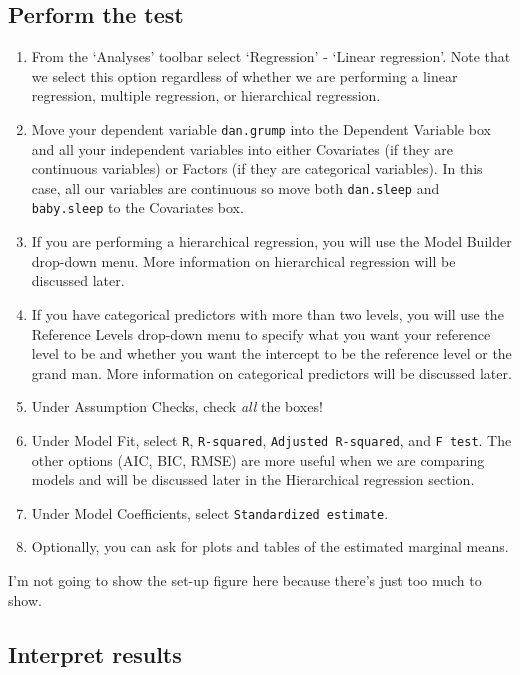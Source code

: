 \documentclass[
]{book}
\begin{document}
\hypertarget{perform-the-test-10}{%
\subsection{Perform the test}\label{perform-the-test-10}}

\begin{enumerate}
\def\labelenumi{\arabic{enumi}.}
\item
  From the `Analyses' toolbar select `Regression' - `Linear regression'. Note that we select this option regardless of whether we are performing a linear regression, multiple regression, or hierarchical regression.
\item
  Move your dependent variable \texttt{dan.grump} into the Dependent Variable box and all your independent variables into either Covariates (if they are continuous variables) or Factors (if they are categorical variables). In this case, all our variables are continuous so move both \texttt{dan.sleep} and \texttt{baby.sleep} to the Covariates box.
\item
  If you are performing a hierarchical regression, you will use the Model Builder drop-down menu. More information on hierarchical regression will be discussed later.
\item
  If you have categorical predictors with more than two levels, you will use the Reference Levels drop-down menu to specify what you want your reference level to be and whether you want the intercept to be the reference level or the grand man. More information on categorical predictors will be discussed later.
\item
  Under Assumption Checks, check \emph{all} the boxes!
\item
  Under Model Fit, select \texttt{R}, \texttt{R-squared}, \texttt{Adjusted\ R-squared}, and \texttt{F\ test}. The other options (AIC, BIC, RMSE) are more useful when we are comparing models and will be discussed later in the Hierarchical regression section.
\item
  Under Model Coefficients, select \texttt{Standardized\ estimate}.
\item
  Optionally, you can ask for plots and tables of the estimated marginal means.
\end{enumerate}

I'm not going to show the set-up figure here because there's just too much to show.

\hypertarget{interpret-results-6}{%
\subsection{Interpret results}\label{interpret-results-6}}
\end{document}

